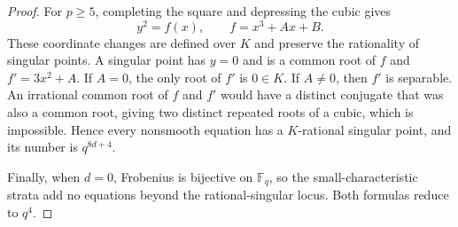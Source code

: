 \documentclass[10pt,a4paper]{amsart}
\newcommand{\Fb}{\mathbb{F}}
\begin{document}
\begin{proof}
For $p\geq5$, completing the square and depressing the cubic gives
\[
y^2=f(x),
\qquad
f=x^3+Ax+B.
\]
These coordinate changes are defined over $K$ and preserve the rationality of singular points.  A singular point has $y=0$ and is a common root of $f$ and $f'=3x^2+A$.  If $A=0$, the only root of $f'$ is $0\in K$.  If $A\neq0$, then $f'$ is separable.  An irrational common root of $f$ and $f'$ would have a distinct conjugate that was also a common root, giving two distinct repeated roots of a cubic, which is impossible. Hence every nonsmooth equation has a $K$-rational singular point, and its number is $q^{8d+4}$.

Finally, when $d=0$, Frobenius is bijective on $\Fb_q$, so the small-characteristic strata add no equations beyond the rational-singular locus.  Both formulas reduce to $q^4$.
\end{proof}
\end{document}
